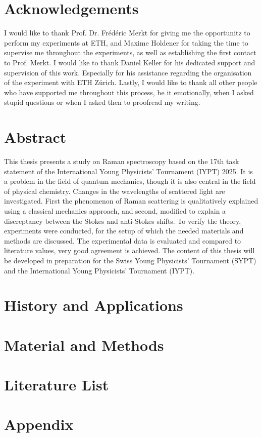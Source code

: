 \documentclass[a4paper]{article}
\begin{document}
\section*{Acknowledgements}

I would like to thank Prof. Dr. Frédéric Merkt for giving me the opportunitz to perform my experiments at ETH, and Maxime Holdener for taking the time to supervise me throughout the experiments, as well as establishing the first contact to Prof. Merkt. I would like to thank Daniel Keller for his dedicated support and supervision of this work. Especially for his assistance regarding the organisation of the experiment with ETH Zürich. Lastly, I would like to thank all other people who have supported me throughout this process, be it emotionally, when I asked stupid questions or when I asked then to proofread my writing.

\newpage


\section*{Abstract}

This thesis presents a study on Raman spectroscopy based on the 17th task statement of the International Young Physicists' Tournament (IYPT) 2025. It is a problem in the field of quantum mechanics, though it is also central in the field of physical chemistry. Changes in the wavelengths of scattered light are investigated. First the phenomenon of Raman scattering is qualitatively explained using a classical mechanics approach, and second, modified to explain a discreptancy between the Stokes and anti-Stokes shifts. To verify the theory, experiments were conducted, for the setup of which the needed materials and methods are discussed. The experimental data is evaluated and compared to literature values, very good agreement is achieved. The content of this thesis will be developed in preparation for the Swiss Young Physicists' Tournament (SYPT) and the International Young Physicists' Tournament (IYPT).

\newpage

\tableofcontents
\newpage

\section{History and Applications}

\newpage


\newpage

\section{Material and Methods}\label{mat_met}

\newpage



\newpage


\newpage



\newpage

\section*{Literature List}
\printbibliography

\newpage

\section{Appendix}

\end{document}
